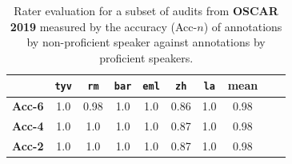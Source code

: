 \begin{table}[!htbp]
    \centering
    \caption{Rater evaluation for a subset of audits from \textbf{CCAligned} (translated from English) measured by the accuracy (Acc-$n$) of annotations by non-proficient speaker against annotations by proficient speakers.
    }
    \label{tab:agreement_ccaligned}
\end{table}

\begin{table}[!htbp]
    \centering\small

    \begin{tabular}{lccccccccc}
        \toprule
                       & \texttt{tyv} & \texttt{rm} & \texttt{bar} & \texttt{eml} & \texttt{zh} & \texttt{la} & \textbf{mean} \\
        \midrule
        \textbf{Acc-6} & 1.0          & 0.98        & 1.0          & 1.0          & 0.86        & 1.0         & 0.98          \\
        \textbf{Acc-4} & 1.0          & 1.0         & 1.0          & 1.0          & 0.87        & 1.0         & 0.98          \\
        \textbf{Acc-2} & 1.0          & 1.0         & 1.0          & 1.0          & 0.87        & 1.0         & 0.98          \\
        \bottomrule
    \end{tabular}%
    \caption{Rater evaluation for a subset of audits from \textbf{OSCAR 2019} measured by the accuracy (Acc-$n$) of annotations by non-proficient speaker against annotations by proficient speakers.}
    \label{tab:agreement_oscar}
\end{table}

